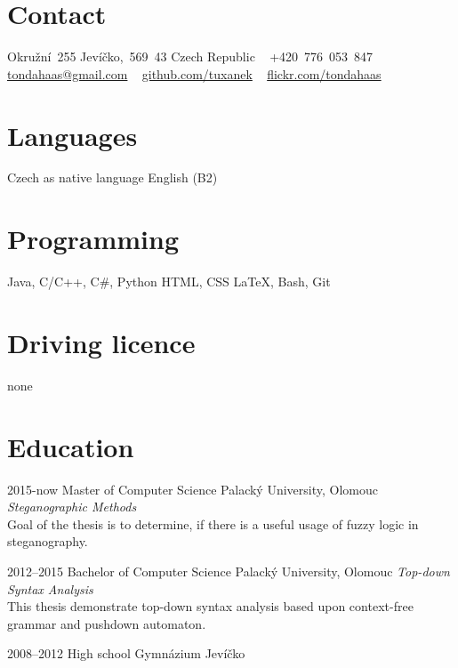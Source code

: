 \documentclass[]{friggeri-cv} %
\begin{document}


\begin{aside} %
\section{Contact}
Okružní~255
Jevíčko,~569~43
Czech Republic
~
+420~776~053~847
\href{mailto:tondahaas@gmail.com}{tondahaas@gmail.com}
~
\href{https://github.com/tuxanek}{github.com/tuxanek}
~
\href{https://flickr.com/tondahaas}{flickr.com/tondahaas}
\section{Languages}
Czech as native language
English (B2)
\section{Programming}
Java, C/C++, C\#, Python
HTML, CSS
LaTeX, Bash, Git
\section{Driving licence}
none
\end{aside}


\section{Education}

\begin{entrylist}

\entry
{2015-now}
{Master {\normalfont of Computer Science}}
{Palacký University, Olomouc}
{\emph{Steganographic Methods} \\ Goal of the thesis is to determine, if there is a useful usage of fuzzy logic in steganography.}

\entry
{2012--2015}
{Bachelor {\normalfont of Computer Science}}
{Palacký University, Olomouc}
{\emph{Top-down Syntax Analysis} \\ This thesis demonstrate top-down syntax analysis based upon context-free grammar and pushdown automaton.}

\entry
{2008--2012}
{{\normalfont High school}}
{Gymnázium Jevíčko}

\end{entrylist}
\end{document}
